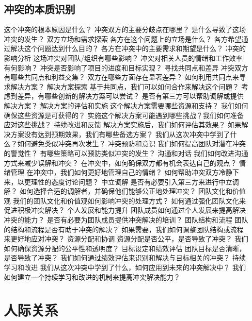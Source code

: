 \documentclass[12pt]{book}
\begin{document}
\subsection{冲突的本质识别}
这个冲突的根本原因是什么？
冲突双方的主要分歧点在哪里？
是什么导致了这场冲突的发生？
双方立场和需求探索
各方在这个问题上的立场是什么？
各方希望通过解决这个问题达到什么目的？
各方在冲突中的主要需求和期望是什么？
冲突的影响分析
这场冲突对团队/组织有哪些影响？
冲突对相关人员的情绪和工作效率有何影响？
冲突是否影响了项目的进度和目标实现？
寻找共同点和差异
冲突双方有哪些共同点和利益交集？
双方在哪些方面存在显著差异？
如何利用共同点来寻求解决方案？
解决方案探索
基于共同点，我们可以如何合作来解决这个问题？
考虑到差异，有哪些创新的解决方案可以尝试？
是否有第三方可以帮助调解或提供解决方案？
解决方案的评估和实施
这个解决方案需要哪些资源和支持？
我们如何确保这些资源是可获得的？
实施这个解决方案可能遇到哪些挑战？我们如何准备应对这些挑战？
持续改进和反馈
解决方案实施后，我们如何评估其效果？
如果解决方案没有达到预期效果，我们有哪些备选方案？
我们从这次冲突中学到了什么？如何避免类似冲突再次发生？
冲突预防和意识
我们如何提高团队对潜在冲突的警觉性？
有哪些策略可以预防类似冲突的发生？
沟通和对话
我们如何改进沟通方式来减少误解和冲突？
在冲突中，如何确保双方都有机会表达自己的观点？
情绪管理
在冲突中，我们如何更好地管理自己的情绪？
如何帮助冲突双方冷静下来，以更理性的态度讨论问题？
中立调解
是否有必要引入第三方来进行中立调解？
如何选择合适的调解者，并确保他们能够公正地处理冲突？
团队文化和价值观
我们的团队文化和价值观如何影响冲突的处理方式？
如何通过强化团队文化来促进积极冲突解决？
个人发展和能力提升
团队成员如何通过个人发展来提高解决冲突的能力？
是否有必要为团队成员提供冲突解决的培训？
团队结构和流程
团队的结构和流程是否有助于冲突的解决？
如果需要，我们如何调整团队结构或流程来更好地应对冲突？
资源分配和协调
资源分配是否公平，是否导致了冲突？
我们如何确保资源分配的公平性和透明度？
目标设定和绩效评估
团队目标是否清晰，是否导致了冲突？
我们如何通过绩效评估来识别和解决与目标相关的冲突？
持续学习和改进
我们从这次冲突中学到了什么，如何应用到未来的冲突解决中？
我们如何建立一个持续学习和改进的机制来提高冲突解决能力？

\section{人际关系}
\end{document}
